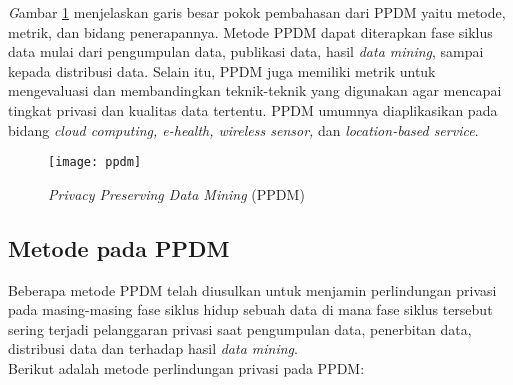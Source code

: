 \textit Gambar \ref{fig:ppdm} menjelaskan garis besar pokok pembahasan dari PPDM yaitu metode, metrik, dan bidang penerapannya. Metode PPDM dapat diterapkan fase siklus data mulai dari pengumpulan data, publikasi data, hasil {\it data mining}, sampai kepada distribusi data. Selain itu, PPDM juga memiliki metrik untuk mengevaluasi dan membandingkan teknik-teknik yang digunakan agar mencapai tingkat privasi dan kualitas data tertentu. PPDM umumnya diaplikasikan pada bidang {\it cloud computing, e-health, wireless sensor,} dan {\it location-based service}.

\begin{figure}[H]
	\centering
	\texttt{[image: ppdm]}
	\caption{\textit{Privacy Preserving Data Mining} (PPDM)}
	\label{fig:ppdm}
\end{figure}

\subsection{Metode pada PPDM}

Beberapa metode PPDM telah diusulkan untuk menjamin perlindungan privasi pada masing-masing fase siklus hidup sebuah data di mana fase siklus tersebut sering terjadi pelanggaran privasi saat pengumpulan data, penerbitan data, distribusi data dan terhadap hasil {\it data mining}. \\ 

\noindent Berikut adalah metode perlindungan privasi pada PPDM:

